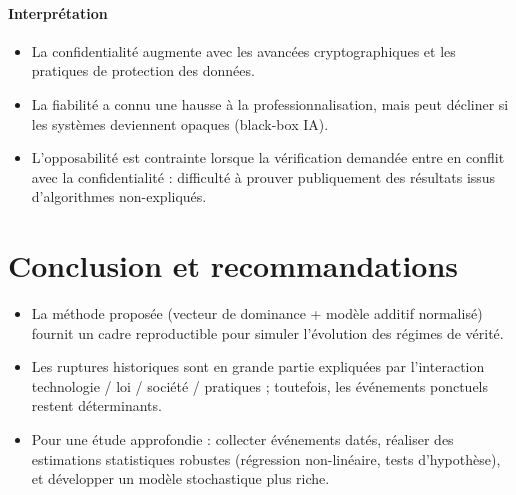 \documentclass[12pt,a4paper]{article}
\begin{document}
\paragraph{Interprétation}
\begin{itemize}
  \item La confidentialité augmente avec les avancées cryptographiques et les pratiques de protection des données.
  \item La fiabilité a connu une hausse à la professionnalisation, mais peut décliner si les systèmes deviennent opaques (black-box IA).
  \item L'opposabilité est contrainte lorsque la vérification demandée entre en conflit avec la confidentialité : difficulté à prouver publiquement des résultats issus d'algorithmes non-expliqués.
\end{itemize}

\section{Conclusion et recommandations}
\begin{itemize}
  \item La méthode proposée (vecteur de dominance + modèle additif normalisé) fournit un cadre reproductible pour simuler l'évolution des régimes de vérité.
  \item Les ruptures historiques sont en grande partie expliquées par l'interaction technologie / loi / société / pratiques ; toutefois, les événements ponctuels restent déterminants.
  \item Pour une étude approfondie : collecter événements datés, réaliser des estimations statistiques robustes (régression non-linéaire, tests d'hypothèse), et développer un modèle stochastique plus riche.
\end{itemize}
\end{document}
